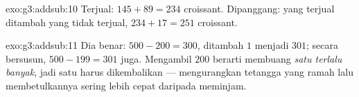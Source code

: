 \begin{solution}{exo:g3:addsub:10}
Terjual: $145 + 89 = 234$ croissant. Dipanggang: yang terjual
ditambah yang tidak terjual, $234 + 17 = 251$ croissant.
\end{solution}

\begin{solution}{exo:g3:addsub:11}
Dia benar: $500 - 200 = 300$, ditambah $1$ menjadi $301$; secara
bersusun, $500 - 199 = 301$ juga. Mengambil $200$ berarti membuang
\emph{satu terlalu banyak}, jadi satu harus dikembalikan ---
mengurangkan tetangga yang ramah lalu membetulkannya sering lebih
cepat daripada meminjam.

\end{solution}
